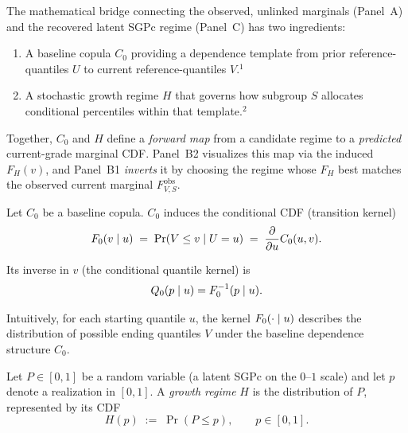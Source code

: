 \documentclass[10pt]{article}
\begin{document}
\noindent
\begin{minipage}[t]{7.65in}
  \vspace{0.05in}
  \hspace{0.15in}%
  \begin{minipage}{7.35in}
    \small\raggedright\color{bodyGrey}

    The mathematical bridge connecting the observed, unlinked marginals (Panel~A) and the recovered latent SGPc regime (Panel~C)
    has two ingredients:
    \begin{enumerate}
      \item A baseline copula $C_0$ providing a dependence template from prior reference-quantiles $U$ to current reference-quantiles $V$.$^\mbox{1}$
      \item A stochastic growth regime $H$ that governs how subgroup $S$ allocates conditional percentiles within that template.$^\mbox{2}$
    \end{enumerate}
    
    \vspace{1pt}
    Together, $C_0$ and $H$ define a \emph{forward map} from a candidate regime to a \emph{predicted} current-grade marginal CDF.
    Panel~B2 visualizes this map via the induced $F_H(v)$, and Panel~B1 \emph{inverts} it by choosing the regime whose $F_H$
    best matches the observed current marginal $F^{\mathrm{obs}}_{V,S}$.

    \vspace{4pt}
    Let $C_0$ be a baseline copula. $C_0$ induces the conditional CDF (transition kernel)
    \[
      F_0(v\mid u)\;=\;\Pr(V\le v\mid U=u)\;=\;\frac{\partial}{\partial u}C_0(u,v).
    \]

    \vspace{1pt}
    Its inverse in $v$ (the conditional quantile kernel) is
    \[
      Q_0(p\mid u)=F_0^{-1}(p\mid u).
    \]

    \vspace{1pt}
    Intuitively, for each starting quantile $u$, the kernel $F_0(\cdot\mid u)$ 
    describes the distribution of possible ending quantiles $V$ under the baseline 
    dependence structure $C_0$.

    \vspace{4pt}
    Let $P\in[0,1]$ be a random variable (a latent SGPc on the $0$--$1$ scale) 
    and let $p$ denote a realization in $[0,1]$. A \emph{growth regime} $H$ is the 
    distribution of $P$, represented by its CDF
    \[
      H(p)\;:=\;\Pr(P\le p),\qquad p\in[0,1].
    \]
    

\end{minipage}
\end{minipage}
\end{document}
